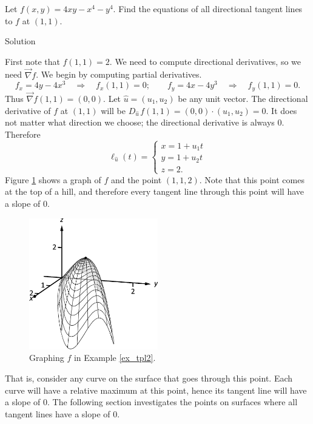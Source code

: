 \begin{example}\label{ex_tpl2}
Let $f(x,y) = 4xy-x^4-y^4$. Find the equations of all directional tangent lines to $f$ at $(1,1)$.

Solution 

First note that $f(1,1) = 2$. We need to compute directional derivatives, so we need $\vec{\nabla} f$. We begin by computing partial derivatives.
$$f_x = 4y-4x^3 \quad \Rightarrow \quad f_x(1,1) = 0;\qquad f_y = 4x-4y^3 \quad \Rightarrow \quad f_y(1,1) = 0.$$
Thus $\vec{\nabla} f(1,1) = \left( 0,0\right)$. Let $\hat u = \left( u_1,u_2\right)$ be any unit vector. The directional derivative of $f$ at $(1,1)$ will be $D_{\hat u\,}f(1,1) = \left( 0,0\right)\cdot \left( u_1,u_2\right) = 0$. It does not matter what direction we choose; the directional derivative is always 0. Therefore
$$\ell_{\hat u}(t) = \left\{\begin{array}{l} x= 1 +u_1t\\ y = 1+ u_2 t\\ z= 2. \end{array}\right.$$
Figure \ref{fig_multi_var_19} shows a graph of $f$ and the point $(1,1,2)$. Note that this point comes at the top of a hill, and therefore every tangent line through this point will have a slope of 0. 

\begin{figure}[H]
	\begin{center}
			\includegraphics[width=0.5\textwidth]{fig_multi_var_19}
	\caption{Graphing $f$ in Example \ref{ex_tpl2}.}
	\label{fig_multi_var_19}
	\end{center}
\end{figure}

That is, consider any curve on the surface that goes through this point. Each curve will have a relative maximum at this point, hence its tangent line will have a slope of 0. The following section investigates the points on surfaces where all tangent lines have a slope of 0.




\end{example}


